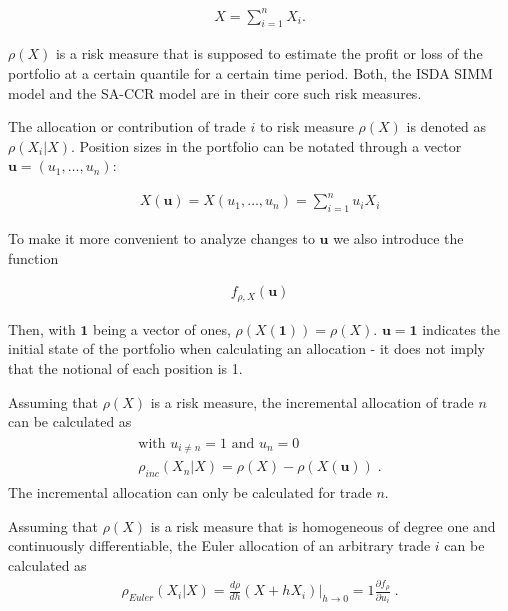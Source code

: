 \documentclass[../Thesis_AHoecherl.tex]{subfiles}
\begin{document}
\begin{align}
    X = \sum_{i=1}^n{X_i} \text{.}
\end{align}

$\rho(X)$ is a risk measure that is supposed to estimate the profit or loss of the portfolio at a certain quantile for a certain time period. 
Both, the \gls{ISDA SIMM} model and the \gls{SA-CCR} model are in their core such risk measures.

The allocation or contribution of trade $i$ to risk measure $\rho(X)$ is denoted as $\rho\left(X_i|X\right)$. Position sizes in the portfolio can be notated through a vector $\mathbf{u} = (u_1,\dots, u_n)$:

\begin{align}
    \label{eq: u formula}
    X(\mathbf{u}) = X(u_1, \dots, u_n) = \sum_{i=1}^{n}{u_iX_i}
\end{align}

To make it more convenient to analyze changes to $\mathbf{u}$ we also introduce the function

\begin{align}
    f_{\rho,X}\left(\mathbf{u}\right)
\end{align}

Then, with $\mathbf{1}$ being a vector of ones, $\rho\left(X\left(\mathbf{1}\right)\right) = \rho\left(X\right)$. $\mathbf{u} = \mathbf{1}$ indicates the initial state of the portfolio when calculating an allocation - it does not imply that the notional of each position is 1.

\begin{definition}
    Assuming that $\rho\left(X\right)$ is a risk measure, the incremental allocation of trade $n$ can be calculated as
    \begin{gather}
        \begin{split}
            \text{with } u_{i\neq n} = 1 \text{ and }u_n = 0\\
            \rho_{inc}\left(X_n|X\right) = \rho\left(X\right) - \rho\left(X\left(\mathbf{u}\right)\right)\; \text{.}
        \end{split}
    \end{gather}
    The incremental allocation can only be calculated for trade $n$.
\end{definition}

\begin{definition}
    Assuming that $\rho\left(X\right)$ is a risk measure that is homogeneous of degree one and continuously differentiable, the Euler allocation of an arbitrary trade $i$ can be calculated as
    \begin{gather}
        \label{eq:Euler allocation}
        \rho_{Euler}\left(X_i|X\right) = \frac{d\rho}{dh}\left(X+hX_i\right)|_{h\rightarrow0} = 1\frac{\partial f_{\rho}}{\partial u_i}  \; \text{.}
    \end{gather}
\end{definition}
\end{document}
